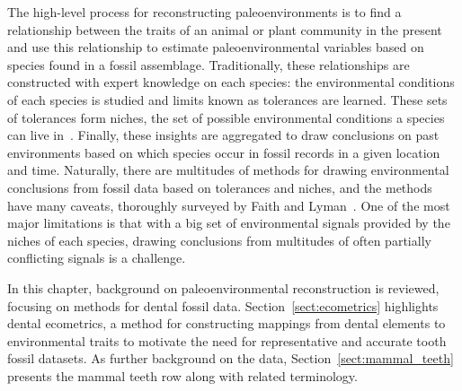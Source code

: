 \documentclass[english,twoside,openright]{UH_DS_MSc}
\begin{document}
The high-level process for reconstructing paleoenvironments is to find a relationship between the traits of an animal or plant community in the present and use this 
relationship to estimate paleoenvironmental variables based on species found in a fossil assemblage.
Traditionally, these relationships are constructed with expert knowledge on each species: the environmental conditions of
each species is studied and limits known as tolerances are learned. These sets of tolerances form niches,
the set of possible environmental conditions a species can live in~\cite{Faith_Lyman_2019_ch2}. Finally, these insights are aggregated to 
draw conclusions on past environments based on which species occur in fossil records in a given location and time.
Naturally, there are multitudes of methods for drawing environmental conclusions from fossil data based on 
tolerances and niches, and the methods have many caveats, thoroughly surveyed by Faith and Lyman~\cite{Faith_Lyman_2019}. One of the most major limitations is that with a big set of environmental signals provided by the niches of each species, drawing conclusions from multitudes of often partially conflicting signals is a challenge.

In this chapter, background on paleoenvironmental reconstruction is reviewed, focusing on methods for dental fossil data.
Section~\ref{sect:ecometrics} highlights dental ecometrics, a method for constructing mappings from dental elements to environmental traits to motivate the 
need for representative and accurate tooth fossil datasets. As further background on the data, Section~\ref{sect:mammal_teeth} presents the mammal teeth 
row along with related terminology.
\end{document}
